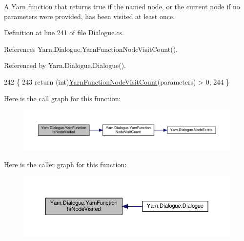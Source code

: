 A \hyperlink{a00045}{Yarn} function that returns true if the named node, or the current node if no parameters were provided, has been visited at least once. 



Definition at line 241 of file Dialogue.\-cs.



References Yarn.\-Dialogue.\-Yarn\-Function\-Node\-Visit\-Count().



Referenced by Yarn.\-Dialogue.\-Dialogue().


\begin{DoxyCode}
242         \{
243             \textcolor{keywordflow}{return} (\textcolor{keywordtype}{int})\hyperlink{a00086_a10c9f22d3f55e74f091cd6069c431094}{YarnFunctionNodeVisitCount}(parameters) > 0;
244         \}
\end{DoxyCode}


Here is the call graph for this function\-:
\nopagebreak
\begin{figure}[H]
\begin{center}
\leavevmode
\includegraphics[width=350pt]{a00086_a1ab129bd84381928531d503304ca08d6_cgraph}
\end{center}
\end{figure}




Here is the caller graph for this function\-:
\nopagebreak
\begin{figure}[H]
\begin{center}
\leavevmode
\includegraphics[width=350pt]{a00086_a1ab129bd84381928531d503304ca08d6_icgraph}
\end{center}
\end{figure}



